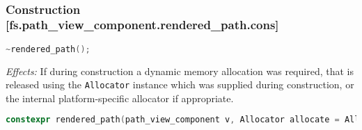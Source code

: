 \documentclass[11pt]{article}
\newcommand{\code}[2][cpp]{\lstinline[language=#1,basicstyle=\small\ttfamily]{#2}}
\newcommand{\desc}[1]{\textit{#1}}
\newcommand{\effects}{\desc{Effects: }}
\begin{document}
~ \\

\subsubsection*{Construction [fs.path\_view\_component.rendered\_path.cons]}

\begin{lstlisting}[language=cpp]
    ~rendered_path();
\end{lstlisting}

\effects If during construction a dynamic memory allocation was required, that is released using the \code{Allocator} instance which was supplied during construction, or the internal platform-specific allocator if appropriate.\\

\begin{lstlisting}[language=cpp]
    constexpr rendered_path(path_view_component v, Allocator allocate = Allocator());
\end{lstlisting}
\end{document}
